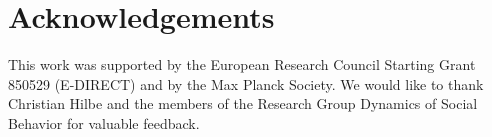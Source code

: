 \documentclass[11pt]{article}
\theoremstyle{plainCl1}
\theoremstyle{plainCl2}
\begin{document}






\section*{Acknowledgements}
This work was supported by the European Research Council Starting Grant 850529 (E-DIRECT) and by the Max Planck Society. We would like to thank Christian Hilbe and the members of the Research Group Dynamics of Social Behavior for valuable feedback.
\newpage
\end{document}
